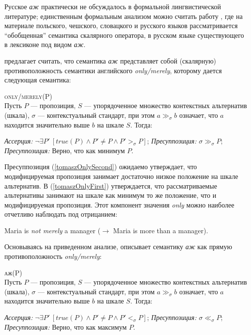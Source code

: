 \documentclass[a4paper, titlepage]{article}
\begin{document}
Русское \textit{аж} практически не обсуждалось в формальной лингвистической литературе; единственным формальным анализом можно считать работу \citep{tomaszevicz2011az}, где на материале польского, чешского, словацкого и русского языков рассматривается ``обобщенная''  семантика скалярного оператора, в русском языке существующего в лексиконе под видом \textit{аж}.

\medskip

\citep{tomaszevicz2011az} предлагает считать, что семантика \textit{аж} представляет собой (скалярную) противоположность семантики английского \textit{only/merely}, которому дается следующая семантика:

\begin{exe}
    \ex \label{tomaszOnly} \textsc{only/merely(P)} \\ {\footnotesize Пусть $ P $ --- пропозиция, $ S $ --- упорядоченное множество контекстных альтернатив (шкала), $ \sigma $ --- контекстуальный стандарт, при  этом $ a \gg_{\sigma} b $ означает, что $ a $ находится значительно выше $ b $ на шкале $ S $. Тогда:} \begin{xlist}
        \ex \textit{Ассерция:} $ \lnot \exists P'\ [true(P) \land P' \neq P \land P' >_{\sigma} P] $;
        \ex \label{tomaszOnlySecond} \textit{Пресуппозиция:} $ \sigma \gg_{\sigma} P $;
        \ex \label{tomaszOnlyFirst} \textit{Пресуппозиция:} Верно, что как минимум $ P $.
    \end{xlist}
\end{exe}

Пресуппозиция (\ref{tomaszOnlySecond}) ожидаемо утверждает, что модифицируемая пропозиция занимает достаточно низкое положение на шкале альтернатив.  В (\ref{tomaszOnlyFirst}) утверждается, что рассматриваемые альтернативы занимают на шкале как минимум то же положение, что и модифицируемая пропозиция. Этот компонент значения \textit{only} можно наиболее отчетливо наблюдать под отрицанием:

\begin{exe}
    \ex Maria is \textit{not merely} a manager ($ \rightarrow $ Maria is more than a manager).
\end{exe}

Основываясь на приведенном анализе, \citep{tomaszevicz2011az} описывает семантику \textit{аж} как прямую противоположность \textit{only/merely}:

\begin{exe}
    \ex \textsc{аж(P)} \\ {\footnotesize Пусть $ P $ --- пропозиция, $ S $ --- упорядоченное множество контекстных альтернатив (шкала), $ \sigma $ --- контекстуальный стандарт, при  этом $ a \gg_{\sigma} b $ означает, что $ a $ находится значительно выше $ b $ на шкале $ S $. Тогда:} \begin{xlist}
        \ex \label{tomaszAzAssert} \textit{Ассерция:} $ \lnot \exists P'\ [ true(P) \land P' \neq P \land P' <_{\sigma} P] $;
        \ex \textit{Пресуппозиция:} $ \sigma \ll_{\sigma} P $;
        \ex \label{tomaszAzPresupMax} \textit{Пресуппозиция:} Верно, что как максимум $ P $.
    \end{xlist}
\end{exe}
\end{document}
